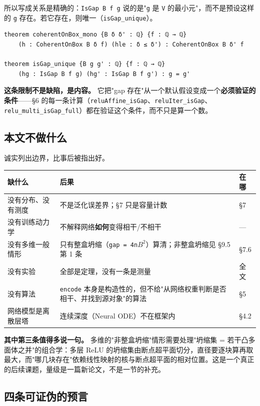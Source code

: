\documentclass[11pt,a4paper]{ctexart}
\begin{document}
所以写成关系是精确的：\texttt{IsGap B f g} 说的是"\texttt{g} 是 \texttt{V} 的最小元"，而不是预设这样的 \texttt{g} 存在。若它存在，则唯一（\texttt{isGap\_unique}）。

\begin{lstlisting}
theorem coherentOnBox_mono {B δ δ' : ℚ} {f : ℚ → ℚ}
    (h : CoherentOnBox B δ f) (hle : δ ≤ δ') : CoherentOnBox B δ' f

theorem isGap_unique {B g g' : ℚ} {f : ℚ → ℚ}
    (hg : IsGap B f g) (hg' : IsGap B f g') : g = g'
\end{lstlisting}

\textbf{这条限制不是缺陷，是内容。} 它把"gap 存在"从一个默认假设变成一个\textbf{必须验证的条件}——§6 的每一条计算（\texttt{reluAffine\_isGap}、\texttt{reluIter\_isGap}、\texttt{relu\_multi\_isGap\_full}）都在验证这个条件，而不只是算一个数。

\subsection{本文不做什么}

诚实列出边界，比事后被指出好。

\begin{center}\small
\begin{tabular}{lll}
\toprule
缺什么 & 后果 & 在哪 \\
\midrule
没有分布、没有测度 & 不是泛化误差界；§7 只是容量计数 & §7 \\
没有训练动力学 & 不解释网络\textbf{如何}变得相干/不相干 & — \\
没有多维一般情形 & 只有整盒坍缩（\texttt{gap = 4n\ensuremath{B^{2}}}）算清；非整盒坍缩见 §9.5 第 1 条 & §7.6 \\
没有实验 & 全部是定理，没有一条是测量 & 全文 \\
没有算法 & \texttt{encode} 本身是构造性的，但不给"从网络权重判断是否相干、并找到源对象"的算法 & §5 \\
网络模型是离散层塔 & 连续深度（Neural ODE）不在框架内 & §4.2 \\
\bottomrule
\end{tabular}
\end{center}

\textbf{其中第三条值得多说一句。} 多维的"非整盒坍缩"情形需要处理"坍缩集 = 若干凸多面体之并"的组合学：多层 ReLU 的坍缩集由断点超平面切分，直径要逐块算再取最大，而"哪几块存在"依赖线性映射的核与断点超平面的相对位置。这是一个真正的后续课题，量级是一篇新论文，不是一节的补充。

\subsection{四条可证伪的预言}
\end{document}
